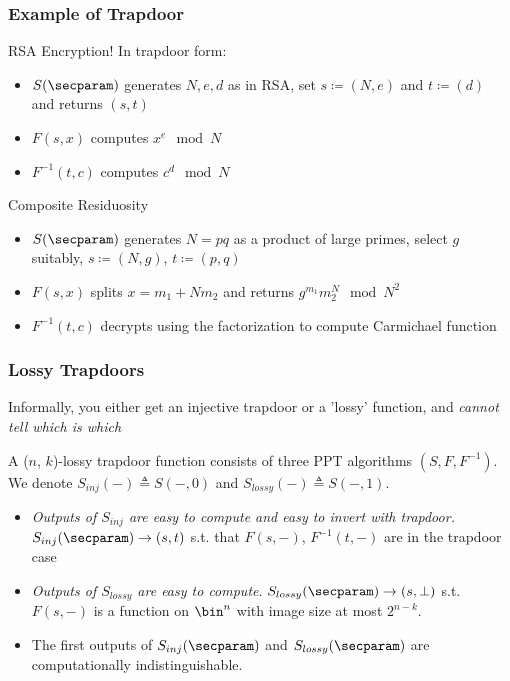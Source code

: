 \documentclass{beamer}
\begin{document}
\begin{frame}
    \frametitle{Example of Trapdoor}
    RSA Encryption! In trapdoor form:
    \begin{itemize}
        \item $S(\secparam)$ generates $N, e, d$ as in RSA,
              set $s \coloneqq (N, e)$ and $t \coloneqq (d)$ and returns $(s, t)$
        \item $F(s, x)$ computes $x^e \mod N$
        \item $F^{-1}(t, c)$ computes $c^d \mod N$
    \end{itemize}
    Composite Residuosity
    \begin{itemize}
        \item $S(\secparam)$ generates $N = pq$ as a product of large primes,
              select $g$ suitably, $s \coloneqq (N, g)$, $t \coloneqq (p, q)$
        \item $F(s, x)$ splits $x = m_1 + N m_2$ and returns $g^{m_1} m_2^N \mod N^2$
        \item $F^{-1}(t, c)$ decrypts using the factorization to compute Carmichael function
    \end{itemize}
\end{frame}

\begin{frame}
    \frametitle{Lossy Trapdoors}
    Informally, you either get an injective trapdoor or a 'lossy' function, and \textit{cannot tell which is which}
    \begin{definition}
        A ($n$, $k$)-lossy trapdoor function consists of three PPT algorithms $(S, F, F^{-1})$.
        We denote $S_{inj}({-}) \triangleq S({-}, 0)$ and $S_{lossy}({-}) \triangleq S({-}, 1)$.
        \begin{itemize}
            \item \textit{Outputs of $S_{inj}$ are easy to compute and easy to invert with trapdoor.}
                  $S_{inj}(\secparam) \rightarrow (s, t)$ s.t. that $F(s, {-})$, $F^{-1}(t, {-})$ are in the trapdoor case
            \item \textit{Outputs of $S_{lossy}$ are easy to compute}.
                  $S_{lossy}(\secparam) \rightarrow (s, \bot)$ s.t. $F(s, {-})$ is a function on $\bin^n$
                  with image size at most $2^{n-k}$.
            \item The first outputs of $S_{inj}(\secparam)$ and $S_{lossy}(\secparam)$ are computationally indistinguishable.
        \end{itemize}
    \end{definition}
\end{frame}
\end{document}
